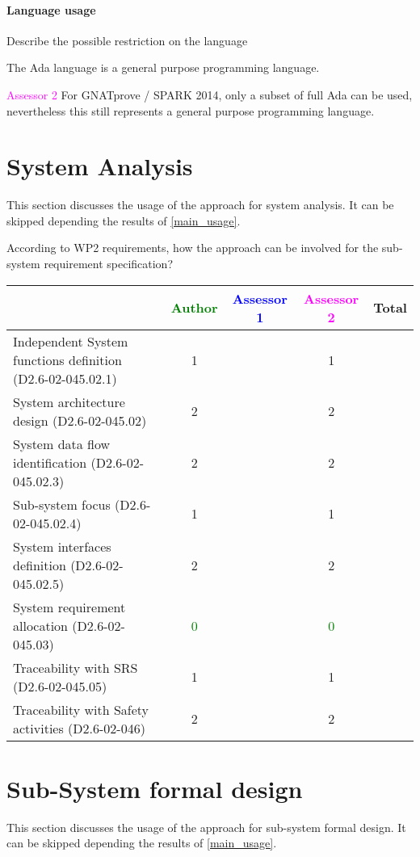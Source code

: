 \paragraph{Language usage} Describe the possible restriction on the language

The Ada language is a general purpose programming language.

\textcolor{magenta}{Assessor 2} For GNATprove / SPARK 2014, only a subset of
full Ada can be used, nevertheless this still represents a general purpose
programming language.

\section{System Analysis}
This section discusses the usage of the approach for system analysis.
It can be skipped depending the results of \ref{main_usage}.

According to WP2 requirements, how the approach can be involved for
the sub-system requirement specification?

\begin{tabular}{|l | c | c | c | c|}
\hline
& \textcolor{green}{Author} & \textcolor{blue}{Assessor 1} & \textcolor{magenta}{Assessor 2} & Total \\
\hline
Independent System functions definition (D2.6-02-045.02.1)  & 1    & & 1    &  \\
\hline
System architecture design (D2.6-02-045.02) & 2    & & 2    &  \\
\hline
System data flow identification (D2.6-02-045.02.3)  & 2    & & 2    &  \\
\hline
Sub-system focus (D2.6-02-045.02.4)  & 1    & & 1    &  \\
\hline
System interfaces definition (D2.6-02-045.02.5)  & 2    & & 2    &  \\
\hline
System requirement allocation (D2.6-02-045.03)  & \textcolor{green}{0} & & \textcolor{green}{0} &  \\
\hline
Traceability with SRS (D2.6-02-045.05)  & 1    & & 1    &  \\
\hline
Traceability with Safety activities (D2.6-02-046)  & 2    & & 2    &  \\
\hline
\end{tabular}



\section{Sub-System formal design}
This section discusses the usage of the approach for sub-system formal design.
It can be skipped depending the results of \ref{main_usage}.

